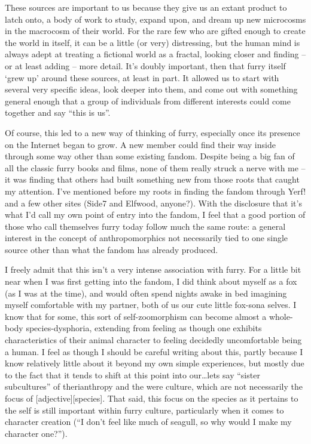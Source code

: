 These sources are important to us because they give us an extant product to latch onto, a body of work to study, expand upon, and dream up new microcosms in the macrocosm of their world.  For the rare few who are gifted enough to create the world in itself, it can be a little (or very) distressing, but the human mind is always adept at treating a fictional world as a fractal, looking closer and finding -- or at least adding -- more detail.  It's doubly important, then that furry itself ‘grew up' around these sources, at least in part.  It allowed us to start with several very specific ideas, look deeper into them, and come out with something general enough that a group of individuals from different interests could come together and say ``this is us''.

Of course, this led to a new way of thinking of furry, especially once its presence on the Internet began to grow.  A new member could find their way inside through some way other than some existing fandom.  Despite being a big fan of all the classic furry books and films, none of them really struck a nerve with me -- it was finding that others had built something new from those roots that caught my attention.  I've mentioned before my roots in finding the fandom through Yerf! and a few other sites (Side7 and Elfwood, anyone?).  With the disclosure that it's what I'd call my own point of entry into the fandom, I feel that a good portion of those who call themselves furry today follow much the same route: a general interest in the concept of anthropomorphics not necessarily tied to one single source other than what the fandom has already produced.

I freely admit that this isn't a very intense association with furry.  For a little bit near when I was first getting into the fandom, I did think about myself as a fox (as I was at the time), and would often spend nights awake in bed imagining myself comfortable with my partner, both of us our cute little fox-sona selves.  I know that for some, this sort of self-zoomorphism can become almost a whole-body species-dysphoria, extending from feeling as though one exhibits characteristics of their animal character to feeling decidedly uncomfortable being a human.  I feel as though I should be careful writing about this, partly because I know relatively little about it beyond my own simple experiences, but mostly due to the fact that it tends to shift at this point into our…lets say ``sister subcultures'' of therianthropy and the were culture, which are not necessarily the focus of [adjective][species].  That said, this focus on the species as it pertains to the self is still important within furry culture, particularly when it comes to character creation (``I don't feel like much of seagull, so why would I make my character one?'').

